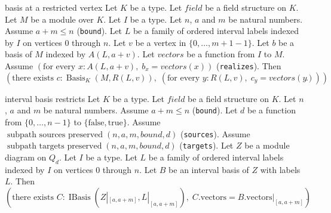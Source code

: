 \begin{cleanresult}{basis at a restricted vertex}
Let $K$ be a type.
Let $\mathit{field}$ be a field structure on $K$.
Let $M$ be a module over $K$.
Let $I$ be a type.
Let $n$, $a$ and $m$ be natural numbers.
Assume $a + m \le n$ (\texttt{bound}).
Let $L$ be a family of ordered interval labels indexed by $I$ on vertices $0$ through $n$.
Let $v$ be a vertex in $\{0,\ldots,m + 1-1\}$.
Let $b$ be a basis of $M$ indexed by $A(L,a+v)$.
Let $\mathit{vectors}$ be a function from $I$ to $M$.
Assume $\left(\text{for every }x : A(L,a+v),\; b_{x} = \mathit{vectors}(x)\right)$ (\texttt{realizes}).
Then \[\left(\text{there exists }c : \operatorname{Basis}_{K}(M,R(L,v)),\; \left(\text{for every }y : R(L,v),\; c_{y} = \mathit{vectors}(y)\right)\right).\]
\end{cleanresult}

\begin{cleanresult}{interval basis restricts}
Let $K$ be a type.
Let $\mathit{field}$ be a field structure on $K$.
Let $n$, $a$ and $m$ be natural numbers.
Assume $a + m \le n$ (\texttt{bound}).
Let $d$ be a function from $\{0,\ldots,n-1\}$ to $\{\mathrm{false},\mathrm{true}\}$.
Assume $\operatorname{subpath\ sources\ preserved}(n, a, m, \mathit{bound}, d)$ (\texttt{sources}).
Assume $\operatorname{subpath\ targets\ preserved}(n, a, m, \mathit{bound}, d)$ (\texttt{targets}).
Let $Z$ be a module diagram on $Q_{d}$.
Let $I$ be a type.
Let $L$ be a family of ordered interval labels indexed by $I$ on vertices $0$ through $n$.
Let $B$ be an interval basis of $Z$ with labels $L$.
Then \[\left(\text{there exists }C : \operatorname{IBasis}(Z|_{[a,a+m]},L|_{[a,a+m]}),\; C.\mathrm{vectors} = B.\mathrm{vectors}|_{[a,a+m]}\right).\]
\end{cleanresult}

